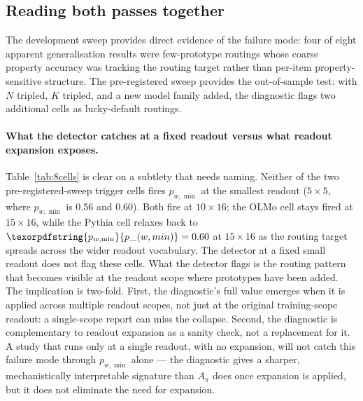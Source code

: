 \documentclass[11pt,letterpaper]{article}
\newcommand{\pwmin}{\texorpdfstring{\ensuremath{p_{w,\min}}}{p\_(w,min)}}
\begin{document}
\subsection{Reading both passes together}

The development sweep provides direct evidence of the failure mode:
four of eight apparent generalisation results were few-prototype
routings whose coarse property accuracy was tracking the routing
target rather than per-item property-sensitive structure. The
pre-registered sweep provides the out-of-sample test: with $N$
tripled, $K$ tripled, and a new model family added, the diagnostic
flags two additional cells as lucky-default routings.

\paragraph{What the detector catches at a fixed readout versus what
readout expansion exposes.} Table~\ref{tab:8cells} is clear on a
subtlety that needs naming. Neither of the two pre-registered-sweep
trigger cells fires \pwmin{} at the smallest readout ($5 \times 5$,
where \pwmin{} is $0.56$ and $0.60$). Both fire at $10 \times 16$;
the OLMo cell stays fired at $15 \times 16$, while the Pythia cell
relaxes back to $\pwmin = 0.60$ at $15 \times 16$ as the routing
target spreads across the wider readout vocabulary. The detector at
a fixed small readout does not flag these cells. What the detector
flags is the routing pattern that becomes visible at the readout
scope where prototypes have been added. The implication is two-fold.
First, the diagnostic's full value emerges when it is applied across
multiple readout scopes, not just at the original training-scope
readout: a single-scope report can miss the collapse. Second, the
diagnostic is complementary to readout expansion as a sanity check,
not a replacement for it. A study that runs only at a single
readout, with no expansion, will not catch this failure mode through
\pwmin{} alone --- the diagnostic gives a sharper, mechanistically
interpretable signature than $A_\pi$ does once expansion is applied,
but it does not eliminate the need for expansion.
\end{document}
